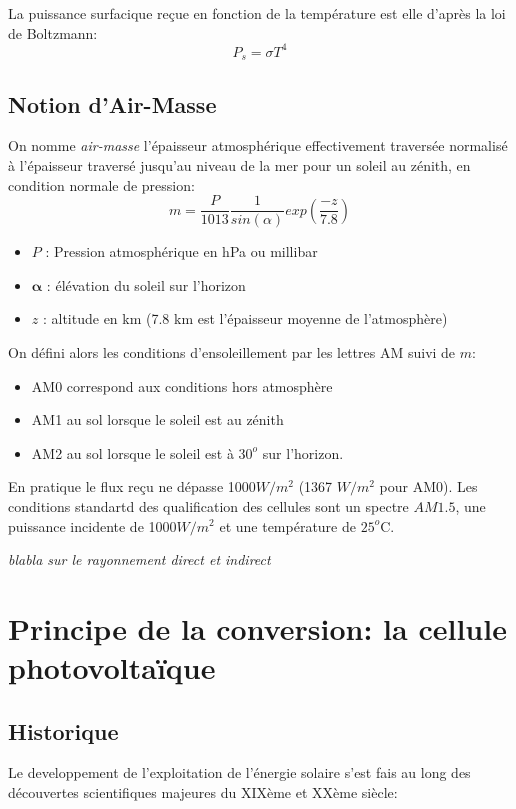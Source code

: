 \documentclass[main.tex]{subfiles}
\begin{document}
La puissance surfacique reçue en fonction de la température est elle d'après la loi de Boltzmann:
\[
  P_s = \sigma T^4
\]
\subsection{Notion d'Air-Masse}

\begin{defin}
On nomme \emph{air-masse} l'épaisseur atmosphérique effectivement traversée normalisé à l'épaisseur traversé jusqu'au niveau de la mer pour un soleil au zénith, en condition normale de pression:
\[
  m = \frac{P}{1013}\frac{1}{sin(\alpha)}exp\left(\frac{-z}{7.8}\right)
\]
\begin{itemize}[label=--]
\item $P$ : Pression atmosphérique en hPa ou millibar
\item $\mathbf{\alpha}$ : élévation du soleil sur l'horizon
\item $z$ :  altitude en km (7.8 km est l'épaisseur moyenne de l'atmosphère)
\end{itemize}
\end{defin}

On défini alors les conditions d'ensoleillement par les lettres AM suivi de $m$:
  \begin{itemize}
  \item AM0 correspond aux conditions hors atmosphère
  \item AM1 au sol lorsque le soleil est au zénith
  \item AM2 au sol lorsque le soleil est à $30^o$ sur l'horizon.
  \end{itemize}

En pratique le flux reçu ne dépasse 1000$W/m^2$ (1367 $W/m^2$ pour AM0).
Les conditions standartd des qualification des cellules sont un spectre $AM1.5$, une puissance incidente de 1000$W/m^2$ et une température de $25^o$C.


\emph{blabla sur le rayonnement direct et indirect}


\section{Principe de la conversion: la cellule photovoltaïque}
\subsection{Historique}
Le developpement de l'exploitation de l'énergie solaire s'est fais au long des découvertes scientifiques majeures du XIXème et XXème siècle:
\end{document}
